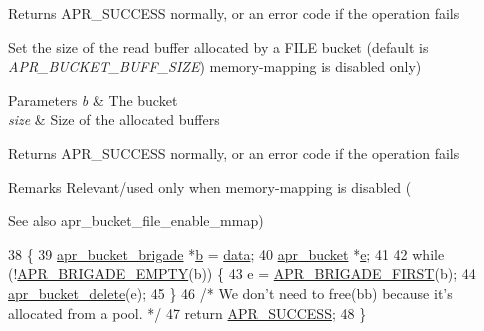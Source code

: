 \begin{DoxyReturn}{Returns}
A\+P\+R\+\_\+\+S\+U\+C\+C\+E\+SS normally, or an error code if the operation fails
\end{DoxyReturn}
Set the size of the read buffer allocated by a F\+I\+LE bucket (default is {\itshape A\+P\+R\+\_\+\+B\+U\+C\+K\+E\+T\+\_\+\+B\+U\+F\+F\+\_\+\+S\+I\+ZE}) memory-\/mapping is disabled only) 
\begin{DoxyParams}{Parameters}
{\em b} & The bucket \\
\hline
{\em size} & Size of the allocated buffers \\
\hline
\end{DoxyParams}
\begin{DoxyReturn}{Returns}
A\+P\+R\+\_\+\+S\+U\+C\+C\+E\+SS normally, or an error code if the operation fails 
\end{DoxyReturn}
\begin{DoxyRemark}{Remarks}
Relevant/used only when memory-\/mapping is disabled (
\end{DoxyRemark}
\begin{DoxySeeAlso}{See also}
apr\+\_\+bucket\+\_\+file\+\_\+enable\+\_\+mmap) 
\end{DoxySeeAlso}

\begin{DoxyCode}
38 \{
39     \hyperlink{structapr__bucket__brigade}{apr\_bucket\_brigade} *\hyperlink{group__APACHE__CORE__PROTO_ga7fa09c5c80a7d25b74511944f5949e31}{b} = \hyperlink{group__APACHE__CORE__LOG_gae4950db1dbfff8459a712737063b61aa}{data};
40     \hyperlink{structapr__bucket}{apr\_bucket} *\hyperlink{group__APR__Util__Bucket__Brigades_gacd90314acb2c2e5cd19681136c08efac}{e};
41 
42     \textcolor{keywordflow}{while} (!\hyperlink{group__APR__Util__Bucket__Brigades_ga836f61da6cce15074eff257ce4b6fc0f}{APR\_BRIGADE\_EMPTY}(b)) \{
43         e = \hyperlink{group__APR__Util__Bucket__Brigades_gab5826a11eb6ba90786a94282f806c230}{APR\_BRIGADE\_FIRST}(b);
44         \hyperlink{group__APR__Util__Bucket__Brigades_ga8925c02a7f95e8c1c3986294d4678797}{apr\_bucket\_delete}(e);
45     \}
46     \textcolor{comment}{/* We don't need to free(bb) because it's allocated from a pool. */}
47     \textcolor{keywordflow}{return} \hyperlink{group__apr__errno_ga9ee311b7bf1c691dc521d721339ee2a6}{APR\_SUCCESS};
48 \}
\end{DoxyCode}
